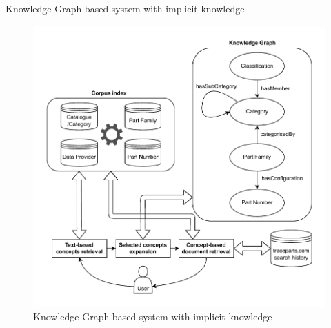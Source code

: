 \begin{frame}{Knowledge Graph-based system with implicit knowledge}

    \begin{figure} [H]
        \begin{center}
            \includegraphics[scale=0.45]{images/tp-expe-kg-based-search-hist-sys.pdf} 
            \caption{Knowledge Graph-based system with implicit knowledge} 
        \end{center}
    \end{figure}

\end{frame}

